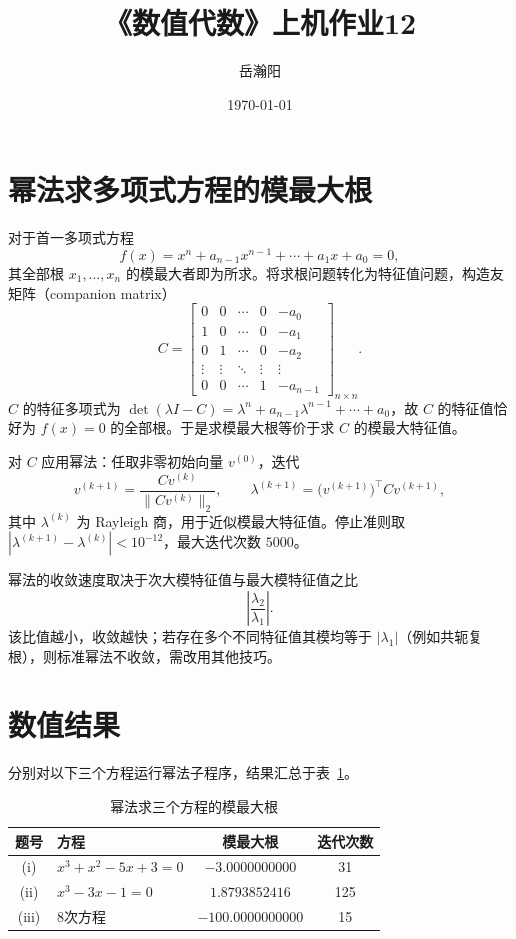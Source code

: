 \documentclass[10pt, a4paper]{article}
\title{\textbf{《数值代数》上机作业12}}
\author{岳瀚阳\quad\quad\quad\quad 3230104443}
\date{\today}
\begin{document}
\maketitle

\section{幂法求多项式方程的模最大根}

对于首一多项式方程
\[
f(x) = x^n + a_{n-1}x^{n-1} + \cdots + a_1 x + a_0 = 0,
\]
其全部根 $x_1,\ldots,x_n$ 的模最大者即为所求。将求根问题转化为特征值问题，构造友矩阵（companion matrix）
\[
C = \begin{bmatrix}
0 & 0 & \cdots & 0 & -a_0 \\
1 & 0 & \cdots & 0 & -a_1 \\
0 & 1 & \cdots & 0 & -a_2 \\
\vdots & \vdots & \ddots & \vdots & \vdots \\
0 & 0 & \cdots & 1 & -a_{n-1}
\end{bmatrix}_{n\times n}.
\]
$C$ 的特征多项式为 $\det(\lambda I - C) = \lambda^n + a_{n-1}\lambda^{n-1} + \cdots + a_0$，故 $C$ 的特征值恰好为 $f(x)=0$ 的全部根。于是求模最大根等价于求 $C$ 的模最大特征值。

对 $C$ 应用幂法：任取非零初始向量 $v^{(0)}$，迭代
\[
v^{(k+1)} = \frac{C v^{(k)}}{\|C v^{(k)}\|_2}, \qquad
\lambda^{(k+1)} = \bigl(v^{(k+1)}\bigr)^{\!\top} C v^{(k+1)},
\]
其中 $\lambda^{(k)}$ 为 Rayleigh 商，用于近似模最大特征值。停止准则取 $|\lambda^{(k+1)} - \lambda^{(k)}| < 10^{-12}$，最大迭代次数 $5000$。

幂法的收敛速度取决于次大模特征值与最大模特征值之比
\[
\left|\frac{\lambda_2}{\lambda_1}\right|.
\]
该比值越小，收敛越快；若存在多个不同特征值其模均等于 $|\lambda_1|$（例如共轭复根），则标准幂法不收敛，需改用其他技巧。

\section{数值结果}

分别对以下三个方程运行幂法子程序，结果汇总于表~\ref{tab:results}。

\begin{table}[H]
    \centering
    \caption{幂法求三个方程的模最大根}
    \label{tab:results}
    \begin{tabular}{clcc}
        \toprule
        题号 & 方程 & 模最大根 & 迭代次数 \\
        \midrule
        (i)   & $x^3 + x^2 - 5x + 3 = 0$ & $-3.0000000000$ & 31 \\
        (ii)  & $x^3 - 3x - 1 = 0$       & $1.8793852416$  & 125 \\
        (iii) & 8次方程                   & $-100.0000000000$ & 15 \\
        \bottomrule
    \end{tabular}
\end{table}
\end{document}
